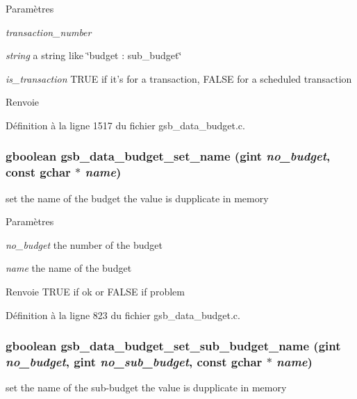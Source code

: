 \begin{DoxyParams}{Paramètres}
\item[{\em transaction\_\-number}]\item[{\em string}]a string like \char`\"{}budget : sub\_\-budget\char`\"{} \item[{\em is\_\-transaction}]TRUE if it's for a transaction, FALSE for a scheduled transaction\end{DoxyParams}
\begin{DoxyReturn}{Renvoie}

\end{DoxyReturn}


Définition à la ligne 1517 du fichier gsb\_\-data\_\-budget.c.

\subsubsection[{gsb\_\-data\_\-budget\_\-set\_\-name}]{\setlength{\rightskip}{0pt plus 5cm}gboolean gsb\_\-data\_\-budget\_\-set\_\-name (gint {\em no\_\-budget}, \/  const gchar $\ast$ {\em name})}\label{gsb__data__budget_8c_ac0f000932feafe9d5c50784eb8fdfd30}
set the name of the budget the value is dupplicate in memory


\begin{DoxyParams}{Paramètres}
\item[{\em no\_\-budget}]the number of the budget \item[{\em name}]the name of the budget\end{DoxyParams}
\begin{DoxyReturn}{Renvoie}
TRUE if ok or FALSE if problem 
\end{DoxyReturn}


Définition à la ligne 823 du fichier gsb\_\-data\_\-budget.c.

\subsubsection[{gsb\_\-data\_\-budget\_\-set\_\-sub\_\-budget\_\-name}]{\setlength{\rightskip}{0pt plus 5cm}gboolean gsb\_\-data\_\-budget\_\-set\_\-sub\_\-budget\_\-name (gint {\em no\_\-budget}, \/  gint {\em no\_\-sub\_\-budget}, \/  const gchar $\ast$ {\em name})}\label{gsb__data__budget_8c_abca491922f1ff328b1bcfe6022209d29}
set the name of the sub-\/budget the value is dupplicate in memory


